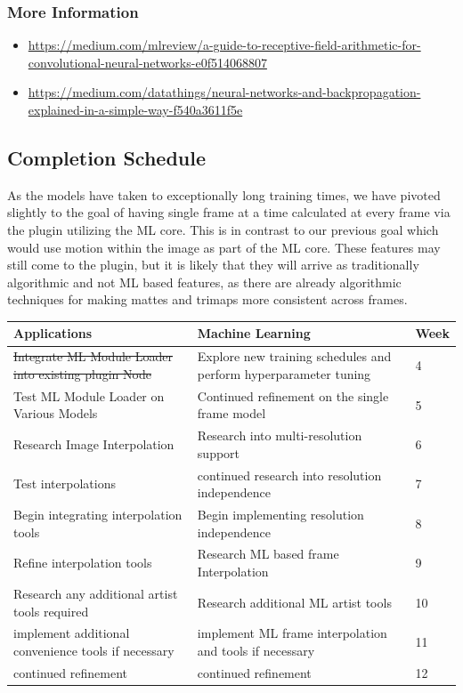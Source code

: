 \documentclass[15pt]{article}
\begin{document}
\subsubsection{More Information}
\label{sec:orgec15ae9}
\begin{itemize}
\item \url{https://medium.com/mlreview/a-guide-to-receptive-field-arithmetic-for-convolutional-neural-networks-e0f514068807}
\item \url{https://medium.com/datathings/neural-networks-and-backpropagation-explained-in-a-simple-way-f540a3611f5e}
\end{itemize}
\subsection{Completion Schedule}
\label{sec:org6a6e700}
As the models have taken to exceptionally long training times, we have pivoted
slightly to the goal of having single frame at a time calculated at every frame
via the plugin utilizing the ML core. This is in contrast to our previous goal
which would use motion within the image as part of the ML core. These features
may still come to the plugin, but it is likely that they will arrive as
traditionally algorithmic and not ML based features, as there are already algorithmic techniques for
making mattes and trimaps more consistent across frames.
\begin{center}
\begin{tabularx}{\textwidth}{XXl}
Applications & Machine Learning & Week\\
\hline
\sout{Integrate ML Module Loader into existing plugin Node} & Explore new training schedules and perform hyperparameter tuning & 4\\
\hline
Test ML Module Loader on Various Models & Continued refinement on the single frame model & 5\\
\hline
Research Image Interpolation & Research into multi-resolution support & 6\\
\hline
Test interpolations & continued research into resolution independence & 7\\
\hline
Begin integrating interpolation tools & Begin implementing resolution independence & 8\\
\hline
Refine interpolation tools & Research ML based frame Interpolation & 9\\
\hline
Research any additional artist tools required & Research additional ML artist tools & 10\\
\hline
implement additional convenience tools if necessary & implement ML frame interpolation and tools if necessary & 11\\
\hline
continued refinement & continued refinement & 12\\
\end{tabularx}
\end{center}
\end{document}
